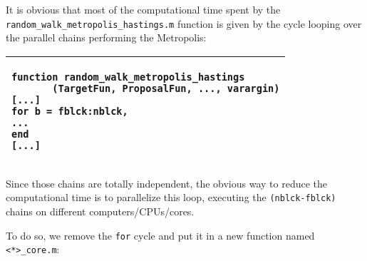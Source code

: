 \documentclass[12pt,a4paper,pdftex]{article}
\begin{document}
It is obvious that most of the computational time spent by the \\ \verb"random_walk_metropolis_hastings.m" function is given by the cycle looping over the parallel chains performing the Metropolis:

\singlespacing
{\footnotesize
\hspace{2cm}\begin{tabular}[b]{| p{9cm} |}
  \hline
\begin{verbatim}
function random_walk_metropolis_hastings
       (TargetFun, ProposalFun, ..., varargin)
[...]
for b = fblck:nblck,
...
end
[...]
\end{verbatim}
\\ \hline
\end{tabular}
}
\doublespacing

Since those chains are totally independent, the obvious way to reduce the computational time is to parallelize this loop, executing the \verb"(nblck-fblck)" chains on different computers/CPUs/cores.


To do so, we remove the \verb"for" cycle and put it in a new function named \verb"<*>_core.m":
\end{document}

